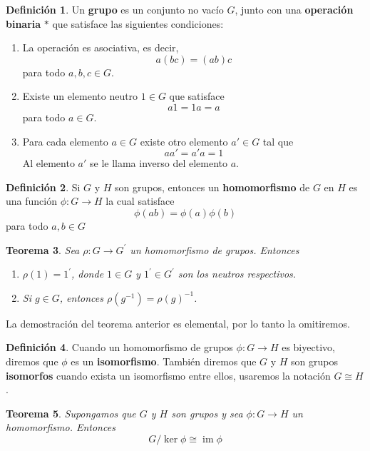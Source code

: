 \documentclass[12pt]{book}
\newtheorem{theorem}{Teorema}[section]
\theoremstyle{definition}
\newtheorem{definition}[theorem]{Definición}
\DeclareMathOperator{\im}{im}
\newcounter{in}
\newcounter{ini}
\begin{document}
{\begin{definition} 
  Un \textbf{grupo} es un conjunto no vacío $G$, junto con una
  \textbf{operación binaria} $*$ que satisface las siguientes condiciones:
    \begin{enumerate}
    \item La operación es asociativa, es decir, $$a(bc)=(ab)c$$ para todo $a,b,c \in G$.
    \item Existe un elemento neutro $1 \in G$ que
      satisface $$a1=1a=a$$ para todo $a \in G$.
    \item Para cada elemento $a \in G$ existe otro elemento $a' \in G$
      tal que $$aa'=a'a=1$$ Al elemento $a'$ se le llama inverso del elemento $a$.
    \end{enumerate}
\end{definition}

\begin{definition}
  Si $G$ y $H$ son grupos, entonces un \textbf{homomorfismo} de $G$
  en $H$ es una función $\phi:G\rightarrow H$ la cual
  satisface $$\phi(ab)=\phi(a)\phi(b)$$ para todo $a,b \in G$
\end{definition}

\begin{theorem}
  Sea $\rho:G\rightarrow G^{'}$ un homomorfismo de grupos. Entonces
  \begin{enumerate}
    \item $\rho(1)=1^{'}$, donde $1\in G$ y  $1^{'}\in G^{'}$ son los
    neutros respectivos. 
    \item Si $g\in G$, entonces $\rho(g^{-1})=\rho (g)^{-1}$.
  \end{enumerate}
\end{theorem}

La demostración del teorema anterior es elemental, por lo tanto la omitiremos.

\begin{definition}
  Cuando un homomorfismo de grupos $\phi:G\rightarrow H$ es biyectivo,
  diremos que $\phi$ es un  \textbf{isomorfismo}. También diremos que
  $G$ y $H$ son grupos  \textbf{isomorfos} cuando exista un
    isomorfismo entre ellos, usaremos la notación $G\cong H$.
\end{definition}

\begin{theorem}
  Supongamos que $G$ y $H$ son grupos y sea $\phi:G\rightarrow H$ un
  homomorfismo. Entonces $$G/\ker \phi\cong \im \phi$$ 
\end{theorem}

}
\end{document}
